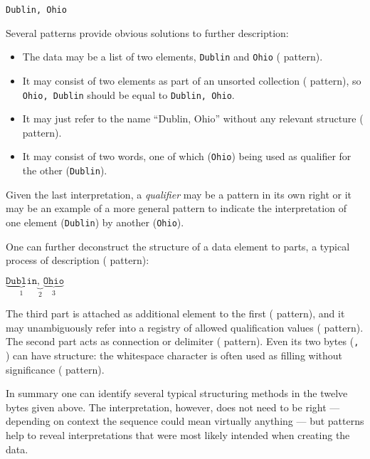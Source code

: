 \begin{center}
\verb|Dublin, Ohio|
\end{center}

\noindent Several patterns provide obvious solutions to further description:

\begin{itemize}

	\item The data may be a list of two elements, \texttt{Dublin} 
		  and \texttt{Ohio}	( pattern).

	\item It may consist of two elements as part of an unsorted collection
		  ( pattern), so
	      \texttt{Ohio, Dublin} should be equal to \texttt{Dublin, Ohio}.

	\item It may just refer to the name ``Dublin, Ohio'' without any 
		  relevant structure ( pattern).

    \item It may consist of two words, one of which (\texttt{Ohio}) being 
		  used as qualifier for the other (\texttt{Dublin}).

\end{itemize}

\noindent Given the last interpretation, a \emph{qualifier} may be a pattern in
its own right or it may be an example of a more general  pattern
to indicate the interpretation of one element (\texttt{Dublin}) by another
(\texttt{Ohio}).

One can further deconstruct the structure of a data element to parts, a typical
process of description ( pattern):

\begin{center}
$\underbrace{\texttt{Dublin}}_{1}%
\underbrace{\texttt{, }}_{2}%
\underbrace{\texttt{Ohio}}_{3}$
\end{center}

\noindent The third part is attached as additional element to the first 
( pattern), and it may unambiguously refer into a registry of
allowed qualification values ( pattern). The second part
acts as connection or delimiter ( pattern). Even its two
bytes (\texttt{, }) can have structure: the whitespace character is often
used as filling without significance ( pattern).

In summary one can identify several typical structuring methods in the twelve
bytes given above. The interpretation, however, does not need to be right ---
depending on context the sequence could mean virtually anything --- but
patterns help to reveal interpretations that were most likely intended when
creating the data.

